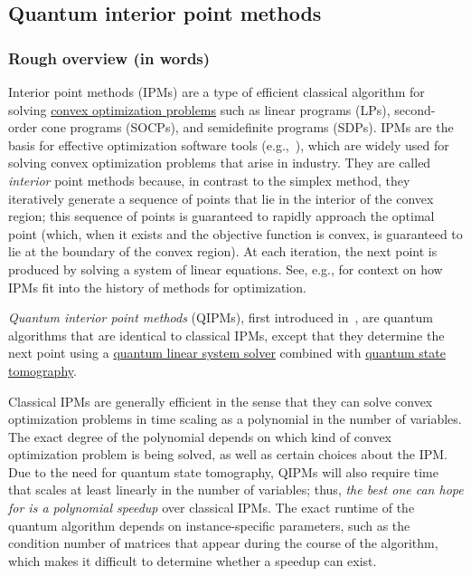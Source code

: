 
\begin{refsection}

\section{Quantum interior point methods}\label{prim:QIPM}

\subsubsection*{Rough overview (in words)}

Interior point methods (IPMs) are a type of efficient classical algorithm for solving \hyperref[appl:ConicProgramming]{convex optimization problems} such as linear programs (LPs), second-order cone programs (SOCPs), and semidefinite programs (SDPs). IPMs are the basis for effective optimization software tools (e.g.,~\cite{domahidi2013ECOS,andersen2000MOSEK}), which are widely used for solving convex optimization problems that arise in industry. They are called \emph{interior} point methods because, in contrast to the simplex method, they iteratively generate a sequence of points that lie in the interior of the convex region; this sequence of points is guaranteed to rapidly approach the optimal point (which, when it exists and the objective function is convex, is guaranteed to lie at the boundary of the convex region). At each iteration, the next point is produced by solving a system of linear equations. See, e.g., \cite{wright2005interior, nemirovski2008interior} for context on how IPMs fit into the history of methods for optimization. 

\emph{Quantum interior point methods} (QIPMs), first introduced in~\cite{kerenidis2018QIntPoint}, are quantum algorithms that are identical to classical IPMs, except that they determine the next point using a \hyperref[prim:QuantumLinearSystemSolvers]{quantum linear system solver} combined with \hyperref[prim:Tomography]{quantum state tomography}.

Classical IPMs are generally efficient in the sense that they can solve convex optimization problems in time scaling as a polynomial in the number of variables. The exact degree of the polynomial depends on which kind of convex optimization problem is being solved, as well as certain choices about the IPM. Due to the need for quantum state tomography, QIPMs will also require time that scales at least linearly in the number of variables; thus, \emph{the best one can hope for is a polynomial speedup} over classical IPMs. The exact runtime of the quantum algorithm depends on instance-specific parameters, such as the condition number of matrices that appear during the course of the algorithm, which makes it difficult to determine whether a speedup can exist.


\end{refsection}
